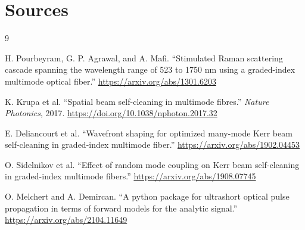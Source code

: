 \documentclass[11pt]{article}
\begin{document}
\section{Sources}

\begin{thebibliography}{9}

H. Pourbeyram, G. P. Agrawal, and A. Mafi.
``Stimulated Raman scattering cascade spanning the wavelength range of
523 to 1750 nm using a graded-index multimode optical fiber.''
\url{https://arxiv.org/abs/1301.6203}

K. Krupa et al.
``Spatial beam self-cleaning in multimode fibres.''
\textit{Nature Photonics}, 2017.
\url{https://doi.org/10.1038/nphoton.2017.32}

E. Deliancourt et al.
``Wavefront shaping for optimized many-mode Kerr beam self-cleaning in
graded-index multimode fiber.''
\url{https://arxiv.org/abs/1902.04453}

O. Sidelnikov et al.
``Effect of random mode coupling on Kerr beam self-cleaning in graded-index
multimode fibers.''
\url{https://arxiv.org/abs/1908.07745}

O. Melchert and A. Demircan.
``A python package for ultrashort optical pulse propagation in terms of forward
models for the analytic signal.''
\url{https://arxiv.org/abs/2104.11649}

\end{thebibliography}
\end{document}
